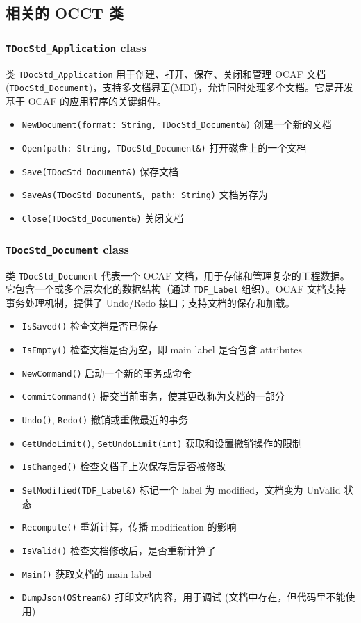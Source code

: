 \documentclass[11pt]{article}
\begin{document}
\subsection{相关的 OCCT 类}
\label{sec:org1c12a69}

\subsubsection{\texttt{TDocStd\_Application} class}
\label{sec:org5ca1b2e}

类 \texttt{TDocStd\_Application} 用于创建、打开、保存、关闭和管理 OCAF 文档(\texttt{TDocStd\_Document})，支持多文档界面(MDI)，允许同时处理多个文档。它是开发基于 OCAF 的应用程序的关键组件。

\begin{itemize}
\item \texttt{NewDocument(format: String, TDocStd\_Document\&)} 创建一个新的文档
\item \texttt{Open(path: String, TDocStd\_Document\&)} 打开磁盘上的一个文档
\item \texttt{Save(TDocStd\_Document\&)} 保存文档
\item \texttt{SaveAs(TDocStd\_Document\&, path: String)} 文档另存为
\item \texttt{Close(TDocStd\_Document\&)} 关闭文档
\end{itemize}
\subsubsection{\texttt{TDocStd\_Document} class}
\label{sec:org7dc14c8}

类 \texttt{TDocStd\_Document} 代表一个 OCAF 文档，用于存储和管理复杂的工程数据。它包含一个或多个层次化的数据结构（通过 \texttt{TDF\_Label} 组织）。OCAF 文档支持事务处理机制，提供了 Undo/Redo 接口；支持文档的保存和加载。

\begin{itemize}
\item \texttt{IsSaved()} 检查文档是否已保存
\item \texttt{IsEmpty()} 检查文档是否为空，即 main label 是否包含 attributes
\item \texttt{NewCommand()} 启动一个新的事务或命令
\item \texttt{CommitCommand()} 提交当前事务，使其更改称为文档的一部分
\item \texttt{Undo()}, \texttt{Redo()} 撤销或重做最近的事务
\item \texttt{GetUndoLimit()}, \texttt{SetUndoLimit(int)} 获取和设置撤销操作的限制
\item \texttt{IsChanged()} 检查文档子上次保存后是否被修改
\item \texttt{SetModified(TDF\_Label\&)} 标记一个 label 为 modified，文档变为 UnValid 状态
\item \texttt{Recompute()} 重新计算，传播 modification 的影响
\item \texttt{IsValid()} 检查文档修改后，是否重新计算了
\item \texttt{Main()} 获取文档的 main label
\item \texttt{DumpJson(OStream\&)} 打印文档内容，用于调试 (文档中存在，但代码里不能使用)
\end{itemize}
\end{document}
